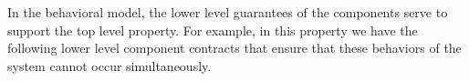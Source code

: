 In the behavioral model, the lower level guarantees of the components serve to support the top level property. For example, in this property we have the following lower level component contracts that ensure that these behaviors of the system cannot occur simultaneously. 












